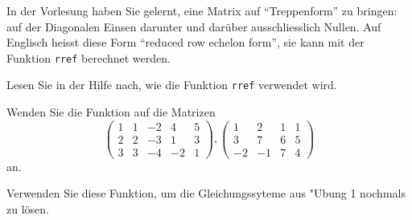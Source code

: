 In der Vorlesung haben Sie gelernt, eine Matrix auf ``Treppenform''
zu bringen: auf der Diagonalen Einsen darunter und darüber
ausschliesslich Nullen. Auf Englisch heisst diese Form ``reduced
row echelon form'', sie kann mit der Funktion {\tt rref} berechnet
werden.
\begin{teilaufgaben}
\item Lesen Sie in der Hilfe nach, wie die Funktion {\tt rref}
verwendet wird.
\item Wenden Sie die Funktion auf die Matrizen
\[
\begin{pmatrix}
1&1&-2&4&5\\
2&2&-3&1&3\\
3&3&-4&-2&1
\end{pmatrix},
\begin{pmatrix}
1&2&1&1\\
3&7&6&5\\
-2&-1&7&4
\end{pmatrix}
\]
an.
\item
Verwenden Sie diese Funktion, um die Gleichungssyteme aus "Ubung
1 nochmals zu lösen.
\end{teilaufgaben}

\begin{loesung}
\begin{teilaufgaben}
\item
\item
{}
\end{teilaufgaben}
\end{loesung}

